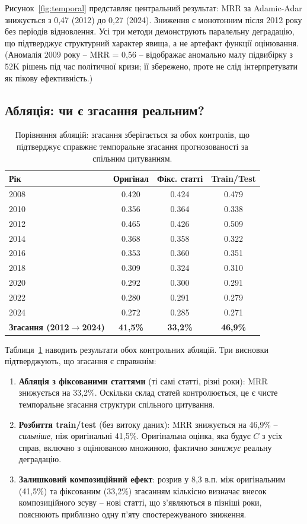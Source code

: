 \documentclass[11pt]{article}
\begin{document}
Рисунок~\ref{fig:temporal} представляє центральний результат: MRR за Adamic-Adar знижується з 0,47 (2012) до 0,27 (2024).
Зниження є монотонним після 2012 року без періодів відновлення.
Усі три методи демонструють паралельну деградацію, що підтверджує структурний характер явища, а не артефакт функції оцінювання.
(Аномалія 2009 року -- MRR = 0,56 -- відображає аномально малу підвибірку з 52K рішень під час політичної кризи; її збережено, проте не слід інтерпретувати як пікову ефективність.)

\subsection{Абляція: чи є згасання реальним?}

\begin{table}[t]
\centering
\small
\caption{Порівняння абляцій: згасання зберігається за обох контролів, що підтверджує справжнє темпоральне згасання прогнозованості за спільним цитуванням.}
\label{tab:ablation}
\begin{tabular}{@{}l ccc@{}}
\toprule
\textbf{Рік} & \textbf{Оригінал} & \textbf{Фікс. статті} & \textbf{Train/Test} \\
\midrule
2008 & 0.420 & 0.424 & 0.479 \\
2010 & 0.356 & 0.364 & 0.338 \\
2012 & 0.465 & 0.426 & 0.509 \\
2014 & 0.368 & 0.358 & 0.322 \\
2016 & 0.353 & 0.360 & 0.351 \\
2018 & 0.309 & 0.324 & 0.310 \\
2020 & 0.292 & 0.300 & 0.291 \\
2022 & 0.280 & 0.291 & 0.279 \\
2024 & 0.272 & 0.285 & 0.271 \\
\midrule
\textbf{Згасання (2012$\to$2024)} & \textbf{41,5\%} & \textbf{33,2\%} & \textbf{46,9\%} \\
\bottomrule
\end{tabular}
\end{table}

Таблиця~\ref{tab:ablation} наводить результати обох контрольних абляцій.
Три висновки підтверджують, що згасання є справжнім:

\begin{enumerate}[nosep,leftmargin=*]
  \item \textbf{Абляція з фіксованими статтями} (ті самі статті, різні роки): MRR знижується на 33,2\%. Оскільки склад статей контролюється, це є чисте темпоральне згасання структури спільного цитування.
  \item \textbf{Розбиття train/test} (без витоку даних): MRR знижується на 46,9\% -- \emph{сильніше}, ніж оригінальні 41,5\%. Оригінальна оцінка, яка будує $C$ з усіх справ, включно з оцінюваною множиною, фактично \emph{занижує} реальну деградацію.
  \item \textbf{Залишковий композиційний ефект}: розрив у 8,3 в.п. між оригінальним (41,5\%) та фіксованим (33,2\%) згасанням кількісно визначає внесок композиційного зсуву -- нові статті, що з'являються в пізніші роки, пояснюють приблизно одну п'яту спостережуваного зниження.
\end{enumerate}
\end{document}
